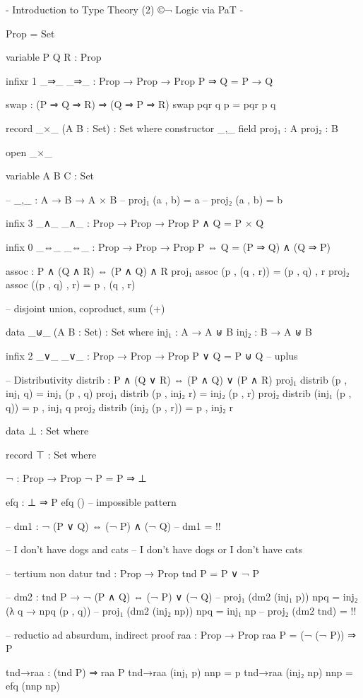 {-
Introduction to Type Theory (2)
©¬
Logic via PaT
-}

Prop = Set

variable P Q R : Prop

infixr 1 _⇒_
_⇒_ : Prop → Prop → Prop
P ⇒ Q = P → Q

swap : (P ⇒ Q ⇒ R) ⇒ (Q ⇒ P ⇒ R)
swap pqr q p = pqr p q

record _×_ (A B : Set) : Set where
  constructor _,_
  field
    proj₁ : A
    proj₂ : B

open _×_

variable A B C : Set

-- _,_ : A → B → A × B
-- proj₁ (a , b) = a
-- proj₂ (a , b) = b

infix 3 _∧_
_∧_ : Prop → Prop → Prop
P ∧ Q = P × Q

infix 0 _⇔_
_⇔_ : Prop → Prop → Prop
P ⇔ Q = (P ⇒ Q) ∧ (Q ⇒ P)

assoc : P ∧ (Q ∧ R) ⇔ (P ∧ Q) ∧ R
proj₁ assoc (p , (q , r)) = (p , q) , r
proj₂ assoc ((p , q) , r) = p , (q , r)

-- disjoint union, coproduct, sum (+)

data _⊎_ (A B : Set) : Set where
  inj₁ : A → A ⊎ B
  inj₂ : B → A ⊎ B

infix 2 _∨_
_∨_ : Prop → Prop → Prop
P ∨ Q = P ⊎ Q -- uplus

-- Distributivity
distrib : P ∧ (Q ∨ R) ⇔ (P ∧ Q) ∨ (P ∧ R)
proj₁ distrib (p , inj₁ q) = inj₁ (p , q) 
proj₁ distrib (p , inj₂ r) = inj₂ (p , r)
proj₂ distrib (inj₁ (p , q)) = p , inj₁ q
proj₂ distrib (inj₂ (p , r)) = p , inj₂ r

data ⊥ : Set where

record ⊤ : Set where

¬ : Prop → Prop
¬ P = P ⇒ ⊥

efq : ⊥ ⇒ P
efq () -- impossible pattern

-- dm1 : ¬ (P ∨ Q) ⇔ (¬ P) ∧ (¬ Q)
-- dm1 = {!!}

-- I don't have dogs and cats
-- I don't have dogs or I don't have cats 

-- tertium non datur
tnd : Prop → Prop
tnd P = P ∨ ¬ P

-- dm2 : tnd P → ¬ (P ∧ Q) ⇔ (¬ P) ∨ (¬ Q)
-- proj₁ (dm2 (inj₁ p)) npq = inj₂ (λ q → npq (p , q))
-- proj₁ (dm2 (inj₂ np)) npq = inj₁ np
-- proj₂ (dm2 tnd) = {!!}

-- reductio ad absurdum, indirect proof
raa : Prop → Prop
raa P = (¬ (¬ P)) ⇒ P

tnd→raa : (tnd P) ⇒ raa P
tnd→raa (inj₁ p) nnp = p
tnd→raa (inj₂ np) nnp = efq (nnp np) 

